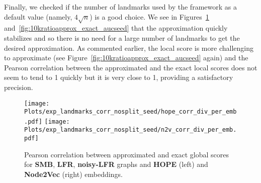 \documentclass[11pt]{article}
\begin{document}

\begin{table}[ht!]
\centering
{}
     \caption{Correlation between approximated and (exact) local scores.}
     \label{tab:cor_approx_exact_loc_scores}
 \end{table}

Finally, we checked if the number of landmarks used by the framework as a default value (namely, $4\sqrt{n}$) is a good choice. We see in Figures~\ref{fig:10kratioapprox_2measseed} and~\ref{fig:10kratioapprox_exact_aucseed} that the approximation quickly stabilizes and so there is no need for a large number of landmarks to get the desired approximation. As commented earlier, the local score is more challenging to approximate (see Figure~\ref{fig:10kratioapprox_exact_aucseed} again) and the Pearson correlation between the approximated and the exact local scores does not seem to tend to 1 quickly but it is very close to 1, providing a satisfactory precision.

\begin{figure}[htb]
    \centering
    \texttt{[image: Plots/exp\_landmarks\_corr\_nosplit\_seed/hope\_corr\_div\_per\_emb.pdf]}
        \hspace{.1cm}
    \texttt{[image: Plots/exp\_landmarks\_corr\_nosplit\_seed/n2v\_corr\_div\_per\_emb.pdf]}
     \caption{Pearson correlation between approximated and exact global scores for \textbf{SMB}, \textbf{LFR}, \textbf{noisy-LFR} graphs and \textbf{HOPE} (left) and \textbf{Node2Vec} (right) embeddings.}
    \label{fig:10kratioapprox_2measseed}
\end{figure}
\end{document}
